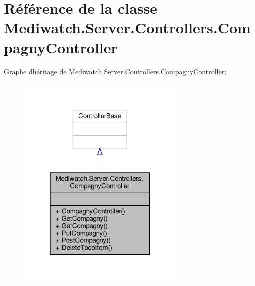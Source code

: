 \hypertarget{class_mediwatch_1_1_server_1_1_controllers_1_1_compagny_controller}{}\section{Référence de la classe Mediwatch.\+Server.\+Controllers.\+Compagny\+Controller}
\label{class_mediwatch_1_1_server_1_1_controllers_1_1_compagny_controller}


Graphe d\textquotesingle{}héritage de Mediwatch.\+Server.\+Controllers.\+Compagny\+Controller\+:
\nopagebreak
\begin{figure}[H]
\begin{center}
\leavevmode
\includegraphics[width=229pt]{class_mediwatch_1_1_server_1_1_controllers_1_1_compagny_controller__inherit__graph}
\end{center}
\end{figure}


